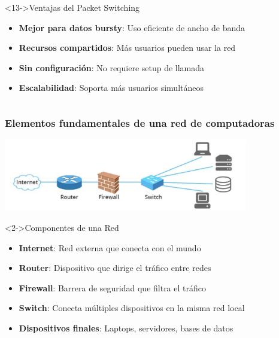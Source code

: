 \documentclass[aspectratio=169]{beamer}
\begin{document}
\begin{frame}
\begin{columns}
\begin{block}<13->{Ventajas del Packet Switching}
\begin{itemize}
\item<13-> \textbf{Mejor para datos bursty}: Uso eficiente de ancho de banda
\item<14-> \textbf{Recursos compartidos}: Más usuarios pueden usar la red
\item<15-> \textbf{Sin configuración}: No requiere setup de llamada
\item<16-> \textbf{Escalabilidad}: Soporta más usuarios simultáneos
\end{itemize}
\end{block}
\end{columns}
\end{frame}

\begin{frame}
\frametitle{Elementos fundamentales de una red de computadoras}

\begin{center}
\includegraphics[width=0.8\textwidth]{figuras/image1001.png}
\end{center}

\begin{block}<2->{Componentes de una Red}
\begin{itemize}
\item<2-> \textbf{Internet}: Red externa que conecta con el mundo
\item<3-> \textbf{Router}: Dispositivo que dirige el tráfico entre redes
\item<4-> \textbf{Firewall}: Barrera de seguridad que filtra el tráfico
\item<5-> \textbf{Switch}: Conecta múltiples dispositivos en la misma red local
\item<6-> \textbf{Dispositivos finales}: Laptops, servidores, bases de datos
\end{itemize}
\end{block}
\end{frame}
\end{document}
